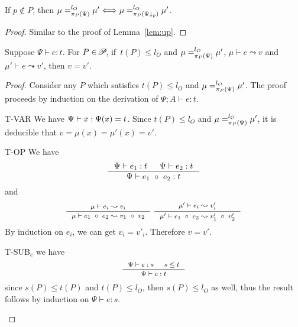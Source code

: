 {{{\begin{lemma}\label{lem:down}
If $p \notin P$, then $\mu =_{\app{\Psi}{P}}^{l_{O}} \mu' \Longleftrightarrow \mu =_{\app{\Psi\downarrow_{p}}{P}}^{l_{O}} \mu'$.
\end{lemma}
\begin{proof}
Similar to the proof of Lemma~\ref{lem:up}.
\end{proof}



\begin{lemma}\label{lem:expsafe}
Suppose $\Psi\vdash e : t$. For $P\in\PPS$, if~$t(P)\leq l_{O}$ and
$\mu =_{\app{\Psi}{P}}^{l_{O}} \mu'$,  $\mu\vdash e\leadsto v$ and $\mu'\vdash e\leadsto v'$, then $v = v'$.
\end{lemma}
\begin{proof}
Consider any $P$ which satisfies $t(P)\leq l_{O}$ and $\mu =_{\app{\Psi}{P}}^{l_{O}} \mu'$.
The proof proceeds by induction on the derivation
of $\Psi;A \vdash e : t$.
\begin{ProofEnumDesc}
\item[T-VAR] We have $\Psi \vdash \leVAR{x} :\Psi(x) = t$.
Since $t(P) \leq l_{O}$ and $\mu =_{\app{\Psi}{P}}^{l_{O}} \mu'$,
it is deducible that $v = \mu(x) = \mu'(x) = v'$.
\item[T-OP] We have
{\myeqsize\begin{equation*}
\inference
{\Psi \vdash e_1 : t & \Psi \vdash e_2 : t}
{\Psi \vdash \leOP{e_1}{e_2} : t}
\end{equation*}}
and
\begin{equation*}\myeqsize
\inference{\mu \vdash e_i \leadsto v_i}{\mu\vdash \leOP{e_1}{e_2}\leadsto  \leOP{v_1}{v_2}} ~
\inference{\mu' \vdash e_i \leadsto v'_i}{\mu'\vdash \leOP{e_1}{e_2}\leadsto \leOP{v'_1}{v'_2}}
\end{equation*}
By induction on $e_i$, we can get $v_i = v'_i$. Therefore $v = v'$.
\item[T-SUB$_e$] we have
\begin{equation*}\myeqsize
\inference
{\Psi\vdash e : s & s \leq t}
{\Psi\vdash e : t}
\end{equation*}
since $s(P)\leq t(P)$ and $t(P)\leq l_{O} $, then $s(P)\leq l_{O}$ as well,
thus the result follows by induction on $\Psi\vdash e : s$.
\end{ProofEnumDesc}
\end{proof}


}}}
